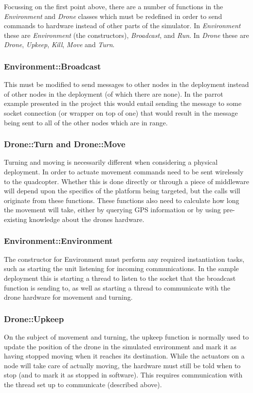 Focussing on the first point above, there are a number of functions in the \textit{Environment} and \textit{Drone} classes which must be redefined in order to send commands to hardware instead of other parts of the simulator. In \textit{Environment} these are \textit{Environment} (the constructors), \textit{Broadcast}, and \textit{Run}. In \textit{Drone} these are \textit{Drone}, \textit{Upkeep}, \textit{Kill}, \textit{Move} and \textit{Turn}.

\subsubsection{Environment::Broadcast}
This must be modified to send messages to other nodes in the deployment instead of other nodes in the deployment (of which there are none). In the parrot example presented in the project this would entail sending the message to some socket connection (or wrapper on top of one) that would result in the message being sent to all of the other nodes which are in range.

\subsubsection{Drone::Turn and Drone::Move}
Turning and moving is necessarily different when considering a physical deployment. In order to actuate movement commands need to be sent wirelessly to the quadcopter. Whether this is done directly or through a piece of middleware will depend upon the specifics of the platform being targeted, but the calls will originate from these functions. These functions also need to calculate how long the movement will take, either by querying GPS information or by using pre-existing knowledge about the drones hardware.

\subsubsection{Environment::Environment}
The constructor for Environment must perform any required instantiation tasks, such as starting the unit listening for incoming communications. In the sample deployment this is starting a thread to listen to the socket that the broadcast function is sending to, as well as starting a thread to communicate with the drone hardware for movement and turning.

\subsubsection{Drone::Upkeep}
On the subject of movement and turning, the upkeep function is normally used to update the position of the drone in the simulated environment and mark it as having stopped moving when it reaches its destination. While the actuators on a node will take care of actually moving, the hardware must still be told when to stop (and to mark it as stopped in software). This requires communication with the thread set up to communicate (described above).

